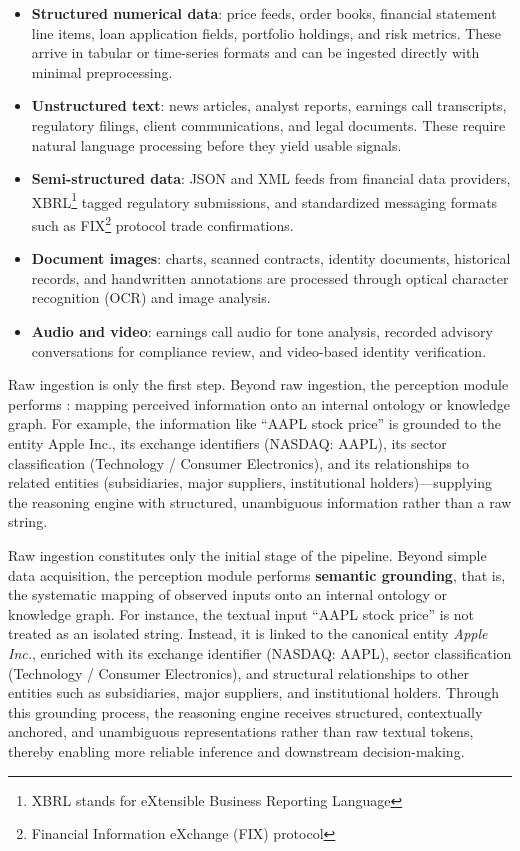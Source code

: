 \documentclass{article}
\begin{document}
\begin{itemize}
  \item \textbf{Structured numerical data}: price feeds, order books, financial statement line items, loan application fields, portfolio holdings, and risk metrics. These arrive in tabular or time-series formats and can be ingested directly with minimal preprocessing.
  \item \textbf{Unstructured text}: news articles, analyst reports, earnings call transcripts, regulatory filings, client communications, and legal documents. These require natural language processing before they yield usable signals.
  \item \textbf{Semi-structured data}: JSON and XML feeds from financial data providers, XBRL\footnote{XBRL stands for eXtensible Business Reporting Language} tagged regulatory submissions, and standardized messaging formats such as FIX\footnote{Financial Information eXchange (FIX) protocol } protocol trade confirmations.
  \item \textbf{Document images}: charts, scanned contracts, identity documents, historical records, and handwritten annotations are processed through optical character recognition (OCR) and image analysis.
  \item \textbf{Audio and video}: earnings call audio for tone analysis, recorded advisory conversations for compliance review, and video-based identity verification.
\end{itemize}

Raw ingestion is only the first step. Beyond raw ingestion, the perception module performs : mapping perceived information onto an internal ontology or knowledge graph. For example, the information like ``AAPL stock price'' is grounded to the entity Apple Inc., its exchange identifiers (NASDAQ: AAPL), its sector classification (Technology / Consumer Electronics), and its relationships to related entities (subsidiaries, major suppliers, institutional holders)—supplying the reasoning engine with structured, unambiguous information rather than a raw string.

Raw ingestion constitutes only the initial stage of the pipeline. Beyond simple data acquisition, the perception module performs \textbf{semantic grounding}, that is, the systematic mapping of observed inputs onto an internal ontology or knowledge graph. For instance, the textual input ``AAPL stock price'' is not treated as an isolated string. Instead, it is linked to the canonical entity \emph{Apple Inc.}, enriched with its exchange identifier (NASDAQ: AAPL), sector classification (Technology / Consumer Electronics), and structural relationships to other entities such as subsidiaries, major suppliers, and institutional holders. Through this grounding process, the reasoning engine receives structured, contextually anchored, and unambiguous representations rather than raw textual tokens, thereby enabling more reliable inference and downstream decision-making.
\end{document}

